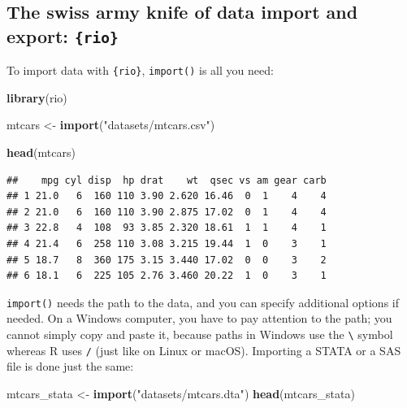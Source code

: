 \documentclass[]{gitbook}
\newenvironment{Shaded}{\begin{snugshade}}{\end{snugshade}}
\newcommand{\KeywordTok}[1]{\textcolor[rgb]{0.13,0.29,0.53}{\textbf{#1}}}
\newcommand{\NormalTok}[1]{#1}
\newcommand{\StringTok}[1]{\textcolor[rgb]{0.31,0.60,0.02}{#1}}
\theoremstyle{definition}
\theoremstyle{definition}
\theoremstyle{definition}
\theoremstyle{remark}
\begin{document}
\hypertarget{the-swiss-army-knife-of-data-import-and-export-rio}{%
\subsection{\texorpdfstring{The swiss army knife of data import and
export:
\texttt{\{rio\}}}{The swiss army knife of data import and export: \{rio\}}}\label{the-swiss-army-knife-of-data-import-and-export-rio}}

To import data with \texttt{\{rio\}}, \texttt{import()} is all you need:

\begin{Shaded}
\begin{Highlighting}[]
\KeywordTok{library}\NormalTok{(rio)}

\NormalTok{mtcars <-}\StringTok{ }\KeywordTok{import}\NormalTok{(}\StringTok{"datasets/mtcars.csv"}\NormalTok{)}
\end{Highlighting}
\end{Shaded}

\begin{Shaded}
\begin{Highlighting}[]
\KeywordTok{head}\NormalTok{(mtcars)}
\end{Highlighting}
\end{Shaded}

\begin{verbatim}
##    mpg cyl disp  hp drat    wt  qsec vs am gear carb
## 1 21.0   6  160 110 3.90 2.620 16.46  0  1    4    4
## 2 21.0   6  160 110 3.90 2.875 17.02  0  1    4    4
## 3 22.8   4  108  93 3.85 2.320 18.61  1  1    4    1
## 4 21.4   6  258 110 3.08 3.215 19.44  1  0    3    1
## 5 18.7   8  360 175 3.15 3.440 17.02  0  0    3    2
## 6 18.1   6  225 105 2.76 3.460 20.22  1  0    3    1
\end{verbatim}

\texttt{import()} needs the path to the data, and you can specify
additional options if needed. On a Windows computer, you have to pay
attention to the path; you cannot simply copy and paste it, because
paths in Windows use the \texttt{\textbackslash{}} symbol whereas R uses
\texttt{/} (just like on Linux or macOS). Importing a STATA or a SAS
file is done just the same:

\begin{Shaded}
\begin{Highlighting}[]
\NormalTok{mtcars_stata <-}\StringTok{ }\KeywordTok{import}\NormalTok{(}\StringTok{"datasets/mtcars.dta"}\NormalTok{)}
\KeywordTok{head}\NormalTok{(mtcars_stata)}
\end{Highlighting}
\end{Shaded}
\end{document}
